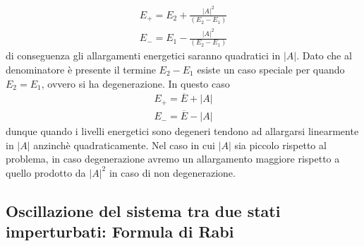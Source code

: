 \begin{align*}
E_+ = E_2 + \frac{|A|^2}{(E_2-E_1)} \\[0.5cm]
E_- = E_1 - \frac{|A|^2}{(E_2- E_1)}	
\end{align*}
di conseguenza gli allargamenti energetici saranno quadratici in $|A|$. Dato che al denominatore \`e presente il termine $E_2-E_1$ esiste un caso speciale per quando $E_2 = E_1$, ovvero si ha degenerazione. In questo caso 
\begin{align*}
	E_+ = \overline{E} + |A| \\[0.5cm]
	E_- = \overline{E} - |A|
\end{align*}
dunque quando i livelli energetici sono degeneri tendono ad allargarsi linearmente in $|A|$ anzinch\`e quadraticamente. Nel caso in cui $|A|$ sia piccolo rispetto al problema, in caso degenerazione avremo un allargamento maggiore rispetto a quello prodotto da $|A|^2$ in caso di non degenerazione.

\subsection{Oscillazione del sistema tra due stati imperturbati: Formula di Rabi}

